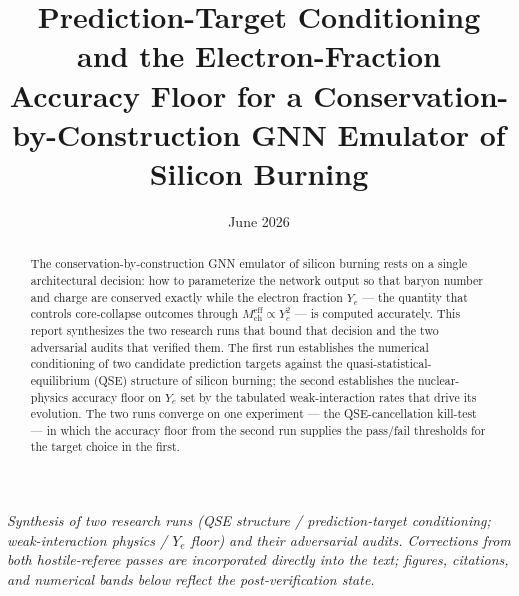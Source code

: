 \documentclass[11pt]{article}
\title{Prediction-Target Conditioning and the Electron-Fraction Accuracy Floor for a Conservation-by-Construction GNN Emulator of Silicon Burning}
\author{}
\date{June 2026}
\begin{document}
\maketitle
\vspace{-3em}
\begin{center}
\small\itshape
Synthesis of two research runs (QSE structure / prediction-target conditioning; weak-interaction physics / $Y_e$ floor) and their adversarial audits. Corrections from both hostile-referee passes are incorporated directly into the text; figures, citations, and numerical bands below reflect the post-verification state.
\end{center}
\vspace{1.5em}

\begin{abstract}
\noindent The conservation-by-construction GNN emulator of silicon burning rests on a single architectural decision: how to parameterize the network output so that baryon number and charge are conserved exactly while the electron fraction $Y_e$ --- the quantity that controls core-collapse outcomes through $M_{\mathrm{ch}}^{\mathrm{eff}} \propto Y_e^2$ --- is computed accurately. This report synthesizes the two research runs that bound that decision and the two adversarial audits that verified them. The first run establishes the numerical conditioning of two candidate prediction targets against the quasi-statistical-equilibrium (QSE) structure of silicon burning; the second establishes the nuclear-physics accuracy floor on $Y_e$ set by the tabulated weak-interaction rates that drive its evolution. The two runs converge on one experiment --- the QSE-cancellation kill-test --- in which the accuracy floor from the second run supplies the pass/fail thresholds for the target choice in the first.


\end{abstract}
\end{document}

